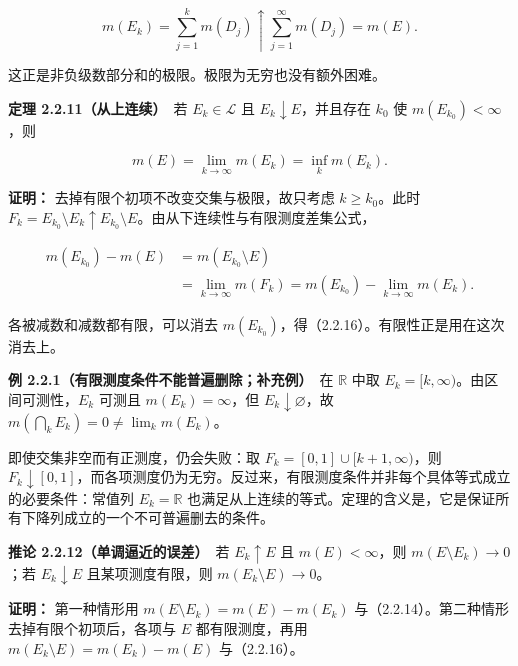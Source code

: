 \documentclass[11pt,a4paper]{article}
\begin{document}
\begin{equation*}
m(E_k)=\sum_{j=1}^k m(D_j)\uparrow\sum_{j=1}^{\infty}m(D_j)=m(E).
\tag{2.2.15}
\end{equation*}

这正是非负级数部分和的极限。极限为无穷也没有额外困难。

\textbf{定理 2.2.11（从上连续）}　若 \(E_k\in\mathcal L\) 且
\(E_k\downarrow E\)，并且存在 \(k_0\) 使 \(m(E_{k_0})<\infty\)，则

\begin{equation*}
m(E)=\lim_{k\to\infty}m(E_k)=\inf_km(E_k).
\tag{2.2.16}
\end{equation*}

\textbf{证明：} 去掉有限个初项不改变交集与极限，故只考虑
\(k\ge k_0\)。此时
\(F_k=E_{k_0}\setminus E_k\uparrow E_{k_0}\setminus E\)。由从下连续性与有限测度差集公式，

\begin{equation*}
\begin{aligned}
m(E_{k_0})-m(E)
&=m(E_{k_0}\setminus E)\\
&=\lim_{k\to\infty}m(F_k)
=m(E_{k_0})-\lim_{k\to\infty}m(E_k).
\end{aligned}
\tag{2.2.17}
\end{equation*}

各被减数和减数都有限，可以消去
\(m(E_{k_0})\)，得（2.2.16）。有限性正是用在这次消去上。

\textbf{例 2.2.1（有限测度条件不能普遍删除；补充例）}　在 \(\mathbb R\)
中取 \(E_k=[k,\infty)\)。由区间可测性，\(E_k\) 可测且
\(m(E_k)=\infty\)，但 \(E_k\downarrow\varnothing\)，故
\(m(\bigcap_kE_k)=0\ne\lim_km(E_k)\)。

即使交集非空而有正测度，仍会失败：取 \(F_k=[0,1]\cup[k+1,\infty)\)，则
\(F_k\downarrow[0,1]\)，而各项测度仍为无穷。反过来，有限测度条件并非每个具体等式成立的必要条件：常值列
\(E_k=\mathbb R\)
也满足从上连续的等式。定理的含义是，它是保证所有下降列成立的一个不可普遍删去的条件。

\textbf{推论 2.2.12（单调逼近的误差）}　若 \(E_k\uparrow E\) 且
\(m(E)<\infty\)，则 \(m(E\setminus E_k)\to0\)；若 \(E_k\downarrow E\)
且某项测度有限，则 \(m(E_k\setminus E)\to0\)。

\textbf{证明：} 第一种情形用 \(m(E\setminus E_k)=m(E)-m(E_k)\)
与（2.2.14）。第二种情形去掉有限个初项后，各项与 \(E\) 都有限测度，再用
\(m(E_k\setminus E)=m(E_k)-m(E)\) 与（2.2.16）。
\end{document}

